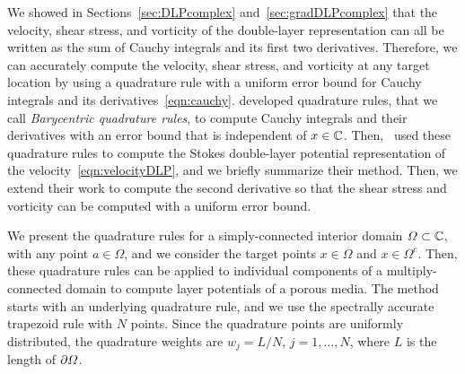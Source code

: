 \documentclass{jfm}
\begin{document}
We showed in Sections~\ref{sec:DLPcomplex} and~\ref{sec:gradDLPcomplex}
that the velocity, shear stress, and vorticity of the double-layer
representation can all be written as the sum of Cauchy integrals and its
first two derivatives.  Therefore, we can accurately compute the
velocity, shear stress, and vorticity at any target location by using a
quadrature rule with a uniform error bound for Cauchy integrals and its
derivatives~\eqref{eqn:cauchy}. \citet{ioa-pap-per1991} developed
quadrature rules, that we call {\em Barycentric quadrature rules}, to
compute Cauchy integrals and their derivatives with an error bound that
is independent of $x \in {\mathbb{C}}$.  Then,~\citet{bar-wu-vee2015} used these
quadrature rules to compute the Stokes double-layer potential
representation of the velocity~\eqref{eqn:velocityDLP}, and we briefly
summarize their method.  Then, we extend their work to compute the
second derivative so that the shear stress and vorticity can be computed
with a uniform error bound. 

We present the quadrature rules for a simply-connected interior domain
$\varOmega \subset {\mathbb{C}}$, with any point $a \in \Omega$, and we consider the
target points $x \in \Omega$ and $x \in \Omega^c$. Then, these
quadrature rules can be applied to individual components of a
multiply-connected domain to compute layer potentials of a porous media.
The method starts with an underlying quadrature rule, and we use the
spectrally accurate trapezoid rule with $N$ points.  Since the
quadrature points are uniformly distributed, the quadrature weights are
$w_j = L/N$, $j=1,\ldots,N$, where $L$ is the length of ${\partial}\varOmega$.
\end{document}
